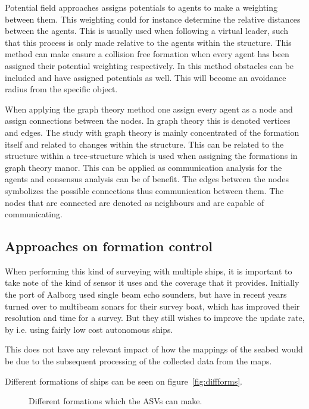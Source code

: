 \begin{description}[style=nextline]
	Potential field approaches assigns potentials to agents to make a weighting between them. This weighting could for instance determine the relative distances between the agents. This is usually used when following a virtual leader, such that this process is only made relative to the agents within the structure. This method can make ensure a collision free formation when every agent has been assigned their potential weighting respectively. In this method obstacles can be included and have assigned potentials as well. This will become an avoidance radius from the specific object.
	\item [Graph Theory Approaches]
	When applying the graph theory method one assign every agent as a node and assign connections between the nodes. In graph theory this is denoted vertices and edges. The study with graph theory is mainly concentrated of the formation itself and related to changes within the structure. This can be related to the structure within a tree-structure which is used when assigning the formations in graph theory manor. This can be applied as communication analysis for the agents and consensus analysis can be of benefit. The edges between the nodes symbolizes the possible connections thus communication between them. The nodes that are connected are denoted as neighbours and are capable of communicating.
\end{description}

\subsection{Approaches on formation control}
When performing this kind of surveying with multiple ships, it is important to take note of the kind of sensor it uses and the coverage that it provides. Initially the port of Aalborg used single beam echo sounders, but have in recent years turned over to multibeam sonars for their survey boat, which has improved their resolution and time for a survey. But they still wishes to improve the update rate, by i.e. using fairly low cost autonomous ships.


This does not have any relevant impact of how the mappings of the seabed would be due to the subsequent processing of the collected data from the maps.

Different formations of ships can be seen on figure~\vref{fig:diffforms}.
\begin{figure}[htbp]
	\centering
	
	\caption{Different formations which the \ac{ASV}s can make.}
	\label{fig:diffforms}
\end{figure}

